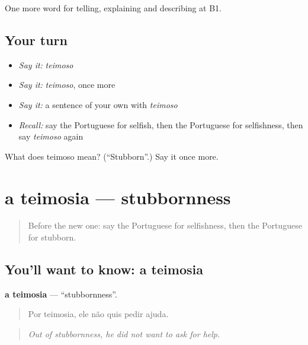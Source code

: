 \begin{grammarlens}[title={What you've built}]
One more word for telling, explaining and describing at B1.
\end{grammarlens}

\subsection*{Your turn}
\begin{itemize}
\raggedright
  \item \emph{Say it:} \emph{teimoso}
  \item \emph{Say it:} \emph{teimoso}, once more
  \item \emph{Say it:} a sentence of your own with \emph{teimoso}
  \item \emph{Recall:} say the Portuguese for selfish, then the Portuguese for selfishness, then say \emph{teimoso} again
\end{itemize}

\begin{tcolorbox}[breakable,colback=teal!4,colframe=teal!35!black,title={Before you move on}]
What does teimoso mean? (\textquotedblleft{}Stubborn\textquotedblright{}.) Say it once more.
\end{tcolorbox}
\section[a teimosia]{a teimosia — stubbornness}

\label{lesson:PT-C469-teimosia}



\begin{quote}
Before the new one: say the Portuguese for selfishness, then the Portuguese for stubborn.
\end{quote}

\subsection*{You'll want to know: a teimosia}
\textbf{a teimosia} — \textquotedblleft{}stubbornness\textquotedblright{}.

\begin{quote}
Por teimosia, ele não quis pedir ajuda.
\end{quote}

\begin{quote}
\emph{Out of stubbornness, he did not want to ask for help.}
\end{quote}

